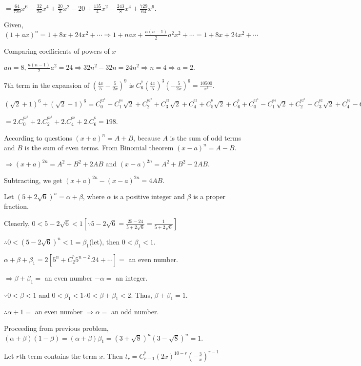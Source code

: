   $= \frac{64}{729}x^6 - \frac{32}{2x}x^4 + \frac{20}{3}x^2 - 20 + \frac{135}{4}x^2 - \frac{243}{8}x^4 +
  \frac{729}{64}x^6$.
\item Given, $(1 + ax)^n = 1 + 8x + 24x^2 + \cdots \Rightarrow 1 + nax + \frac{n(n - 1)}{2}a^2x^2 + \cdots =
  1 + 8x + 24x^2 + \cdots$

  Comparing coefficients of powers of $x$

  $an = 8, \frac{n(n - 1)}{2}a^2 = 24 \Rightarrow 32n^2 - 32n = 24n^2 \Rightarrow n = 4 \Rightarrow a = 2$.
\item $7$th term in the expansion of $\left(\frac{4x}{5} - \frac{5}{2x}\right)^9$ is
  $C_6^^9\left(\frac{4x}{5}\right)^3\left(-\frac{5}{2x}\right)^6 = \frac{10500}{x^3}$.
\item $(\sqrt{2} + 1)^6 + (\sqrt{2} - 1)^6 = C_0^^62^3 + C_1^^64\sqrt{2} + C_2^^62^2 + C_3^^62\sqrt{2} +
  C_4^^62 + C_5^^6\sqrt{2} + C_6^^6 + C_0^^62^3 - C_1^^64\sqrt{2} + C_2^^62^2 - C_3^^62\sqrt{2} +
  C_4^^62 - C_5^^6\sqrt{2} + C_6^^6$

  $=2.C_0^^62^3 + 2.C_2^^62^2 + 2.C_4^^62 + 2.C_6^^6 = 198$.
\item According to questions $(x + a)^n = A + B$, because $A$ is the sum of odd terms and $B$ is the sum of
  even terms. From Binomial theorem $(x - a)^n = A - B$.

  $\Rightarrow (x + a)^{2n} = A^2 + B^2 + 2AB$ and $(x - a)^{2n} = A^2 + B^2 - 2AB$.

  Subtracting, we get $(x + a)^{2n} - (x - a)^{2n} = 4AB$.
\item Let $(5 + 2\sqrt{6})^n = \alpha + \beta$, where $\alpha$ is a positive integer and $\beta$ is a proper
  fraction.

  Cleaerly, $0 < 5 - 2\sqrt{6} < 1\left[\because 5 - 2\sqrt{6} = \frac{25 - 24}{5 + 2\sqrt{6}} = \frac{1}{5
      + 2\sqrt{6}}\right]$

  $\therefore 0 < (5 - 2\sqrt{6})^n < 1 = \beta_1$(let), then $0 < \beta_1 < 1$.

  $\alpha + \beta + \beta_1 = 2[5^n + C_2^^n5^{n - 2}.24 + \cdots] = $ an even number.

  $\Rightarrow \beta + \beta_1 =$ an even number $- \alpha = $ an integer.

  $\because 0 < \beta < 1$ and $0 < \beta_1 < 1\therefore 0 < \beta + \beta_1 < 2$. Thus, $\beta + \beta_1 =
  1$.

  $\therefore \alpha + 1 =$ an even number $\Rightarrow \alpha = $ an odd number.
\item Proceeding from previous problem, $(\alpha + \beta)(1 - \beta) = (\alpha + \beta)\beta_1 = (3 +
  \sqrt{8})^n(3 - \sqrt{8})^n = 1$.
\item Let $r$th term contains the term $x$. Then $t_r = C_{r - 1}^^9(2x)^{10 -
    r}\left(-\frac{3}{x}\right)^{r - 1}$

